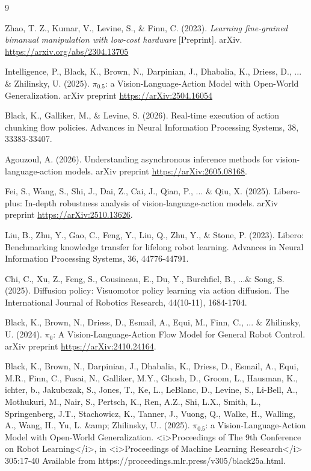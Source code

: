 \documentclass{article}
\begin{document}
{
\small


\begin{thebibliography}{9}

Zhao, T. Z., Kumar, V., Levine, S., \& Finn, C. (2023).
\textit{Learning fine-grained bimanual manipulation with low-cost hardware}
[Preprint]. arXiv.
\url{https://arxiv.org/abs/2304.13705}

Intelligence, P., Black, K., Brown, N., Darpinian, J., Dhabalia, K., Driess, D., ... \& Zhilinsky, U. (2025). $\pi_ {0.5} $: a Vision-Language-Action Model with Open-World Generalization.
arXiv preprint
\url{https://arXiv:2504.16054}

Black, K., Galliker, M., \& Levine, S. (2026). Real-time execution of action chunking flow policies. Advances in Neural Information Processing Systems, 38, 33383-33407.

Agouzoul, A. (2026). Understanding asynchronous inference methods for vision-language-action models. arXiv preprint
\url{https://arXiv:2605.08168}.

Fei, S., Wang, S., Shi, J., Dai, Z., Cai, J., Qian, P., ... \& Qiu, X. (2025). Libero-plus: In-depth robustness analysis of vision-language-action models. arXiv preprint
\url{https://arXiv:2510.13626}.

Liu, B., Zhu, Y., Gao, C., Feng, Y., Liu, Q., Zhu, Y., \& Stone, P. (2023). Libero: Benchmarking knowledge transfer for lifelong robot learning. Advances in Neural Information Processing Systems, 36, 44776-44791.

Chi, C., Xu, Z., Feng, S., Cousineau, E., Du, Y., Burchfiel, B., ...\& Song, S. (2025). Diffusion policy: Visuomotor policy learning via action diffusion. The International Journal of Robotics Research, 44(10-11), 1684-1704.

Black, K., Brown, N., Driess, D., Esmail, A., Equi, M., Finn, C., ... \& Zhilinsky, U. (2024). $\pi_0 $: A Vision-Language-Action Flow Model for General Robot Control. arXiv preprint
\url{https://arXiv:2410.24164}.

Black, K., Brown, N., Darpinian, J., Dhabalia, K., Driess, D., Esmail, A., Equi, M.R., Finn, C., Fusai, N., Galliker, M.Y., Ghosh, D., Groom, L., Hausman, K., ichter, b., Jakubczak, S., Jones, T., Ke, L., LeBlanc, D., Levine, S., Li-Bell, A., Mothukuri, M., Nair, S., Pertsch, K., Ren, A.Z., Shi, L.X., Smith, L., Springenberg, J.T., Stachowicz, K., Tanner, J., Vuong, Q., Walke, H., Walling, A., Wang, H., Yu, L. \&amp; Zhilinsky, U.. (2025). $\pi_0.5$: a Vision-Language-Action Model with Open-World Generalization. <i>Proceedings of The 9th Conference on Robot Learning</i>, in <i>Proceedings of Machine Learning Research</i> 305:17-40 Available from https://proceedings.mlr.press/v305/black25a.html.


\end{thebibliography}}
\end{document}
